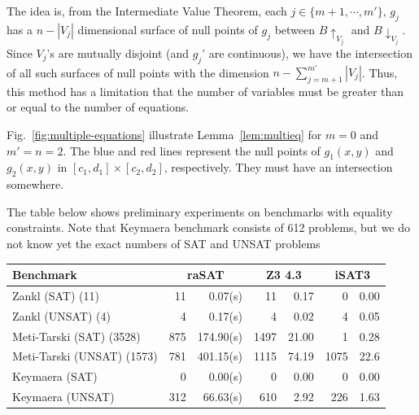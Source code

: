 \documentclass[runningheads,a4paper,oribibl]{llncs}
\begin{document}
The idea is, from the Intermediate Value Theorem,
each $j \in \{m+1, \cdots, m'\}$, $g_j$ has a $n - |V_{j}|$ dimensional surface of
null points of $g_j$ between $B\uparrow_{V_j}$ and $B\downarrow_{V_j}$.
Since $V_j$'s are mutually disjoint (and $g_j$' are continuous),
we have the intersection of all such surfaces of null points with
the dimension $n - \sum_{j=m+1}^{m'} |V_j|$.
Thus, this method has a limitation that 
the number of variables must be greater than or equal to the number of equations.

Fig.~\ref{fig:multiple-equations} illustrate Lemma~\ref{lem:multieq} for $m = 0$ and
$m' = n = 2$. 
The blue and red lines represent the null points of $g_1(x,y)$ and $g_2(x,y)$ in
$[c_1,d_1] \times [c_2,d_2]$, respectively.
They must have an intersection somewhere. %

The table below shows preliminary experiments on benchmarks with equality constraints.
Note that Keymaera benchmark consists of 612 problems, but we do not know yet
the exact numbers of SAT and UNSAT problems 

\begin{center}
\begin{tabular}{ | l | r | r | r | r  | r | r |}
\hline
\multicolumn{1}{|l|}{Benchmark} & \multicolumn{2}{c|}{\bf raSAT} &
\multicolumn{2}{c|}{\bf Z3 4.3} & \multicolumn{2}{c|}{\bf iSAT3}\\
\hline
Zankl (SAT) (11) & 11 & 0.07(s) & 11 & 0.17 & 0 & 0.00 \\
\hline
Zankl (UNSAT) (4) & 4 & 0.17(s) &  4 & 0.02 & 4 & 0.05 \\
\hline
Meti-Tarski (SAT) (3528)   & 875 & 174.90(s) & 1497 & 21.00 & 1 & 0.28  \\
\hline 
Meti-Tarski (UNSAT) (1573) & 781 & 401.15(s) & 1115 & 74.19 & 1075 & 22.6 \\
\hline
Keymaera (SAT)   & 0 & 0.00(s) & 0 & 0.00 & 0 & 0.00 \\
\hline
Keymaera (UNSAT) & 312 & 66.63(s) & 610 & 2.92 & 226 & 1.63\\
\hline 
\end{tabular}
\end{center}
\end{document}
